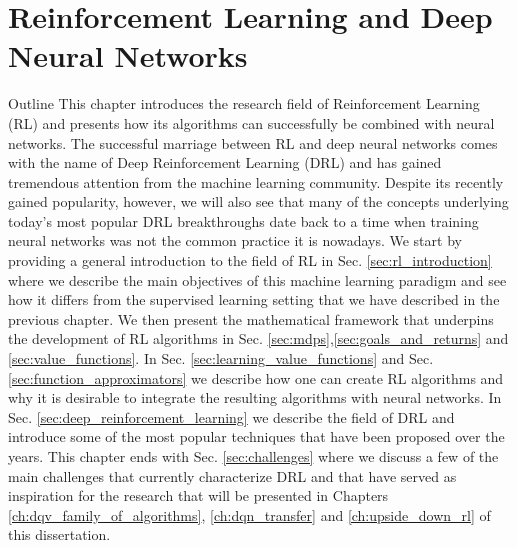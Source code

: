 \chapter{Reinforcement Learning and Deep Neural Networks}
\label{ch:reinforcement_learning}


\begin{remark}{Outline}
This chapter introduces the research field of Reinforcement Learning (RL) and presents how its algorithms can successfully be combined with neural networks. The successful marriage between RL and deep neural networks comes with the name of Deep Reinforcement Learning (DRL) and has gained tremendous attention from the machine learning community. Despite its recently gained popularity, however, we will also see that many of the concepts underlying today's most popular DRL breakthroughs date back to a time when training neural networks was not the common practice it is nowadays. We start by providing a general introduction to the field of RL in Sec. \ref{sec:rl_introduction} where we describe the main objectives of this machine learning paradigm and see how it differs from the supervised learning setting that we have described in the previous chapter. We then present the mathematical framework that underpins the development of RL algorithms in Sec. \ref{sec:mdps},\ref{sec:goals_and_returns} and \ref{sec:value_functions}. In Sec. \ref{sec:learning_value_functions} and Sec. \ref{sec:function_approximators} we describe how one can create RL algorithms and why it is desirable to integrate the resulting algorithms with neural networks. In Sec. \ref{sec:deep_reinforcement_learning} we describe the field of DRL and introduce some of the most popular techniques that have been proposed over the years. This chapter ends with Sec. \ref{sec:challenges} where we discuss a few of the main challenges that currently characterize DRL and that have served as inspiration for the research that will be presented in Chapters \ref{ch:dqv_family_of_algorithms}, \ref{ch:dqn_transfer} and \ref{ch:upside_down_rl} of this dissertation.

\end{remark}

